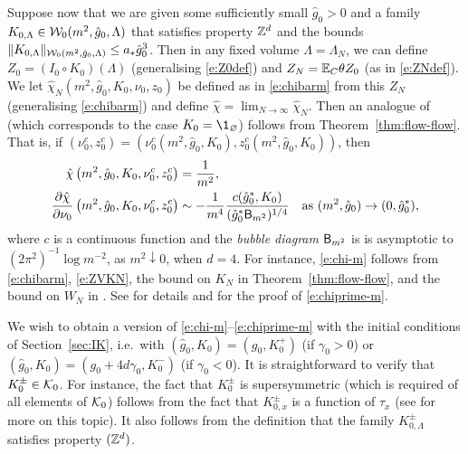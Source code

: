 
Suppose now that we are given some sufficiently small $\hat g_0 > 0$ and
a family $K_{0,\Lambda} \in \mathcal{W}_0(m^2, \hat g_0, \Lambda)$
that satisfies property ${ {{\mathbb Z}}^d }$
and the bounds $\|K_{0,\Lambda}\|_{\mathcal{W}_0(m^2, \hat g_0, \Lambda)} \le a_* \hat g_0^3$.
Then in any fixed volume $\Lambda = \Lambda_N$, we can define $Z_0 = (I_0 \circ K_0)(\Lambda)$
(generalising \eqref{e:Z0def}) and $Z_N = \mathbb{E}_C\theta Z_0$ (as in \eqref{e:ZNdef}).
We let $\hat\chi_N(m^2, \hat g_0, K_0, \nu_0, z_0)$ be defined as in \eqref{e:chibarm}
from this $Z_N$ (generalising \eqref{e:chibarm}) and define $\hat\chi = \lim_{N\to\infty} \hat\chi_N$.
Then an analogue of \cite[Theorem~\ref{log-thm:suscept-diff}]{BBS-saw4-log}
(which corresponds to the case $K_0 = \1_\varnothing$)
follows from Theorem~\ref{thm:flow-flow}.
That is, if $(\nu_0^c, z_0^c) = (\nu_0^c(m^2, \hat g_0, K_0), z_0^c(m^2, \hat g_0, K_0))$, then
\begin{align}
\label{e:chi-m}
\hat\chi \left( m^2,\hat g_0,K_0, \nu_0^c,  z_0^c \right)
  &=
\frac{1}{m^2}, \\
\label{e:chiprime-m}
\frac{\partial \hat\chi}{\partial \nu_0} \left(m^2,\hat g_0, K_0,\nu_0^c,  z_0^c \right)
  &\sim
- \frac{1}{m^4} \frac{c(\hat g_0^*, K_0)}{(\hat g_0^*{\sf B}_{m^2})^{1/4}}
  \quad \text{as $(m^2,\hat g_0) \rightarrow (0,\hat g_0^*)$},
\end{align}
where $c$ is a continuous function
and the \emph{bubble diagram} ${\sf B}_{m^2}$ is
is asymptotic to $(2\pi^2)^{-1} \log m^{-2}$, as $m^2 \downarrow 0$, when $d = 4$.
For instance, \eqref{e:chi-m} follows from \eqref{e:chibarm},
\eqref{e:ZVKN}, the bound on $K_N$ in
Theorem~\ref{thm:flow-flow},
and the bound on $W_N$ in \cite[\eqref{IE-e:W-logwish}]{BS-rg-IE}.
See \cite[Section~\ref{log-sec:suscept-diff-pf}]{BBS-saw4-log}
for details and for the proof of \eqref{e:chiprime-m}.

We wish to obtain a version of \eqref{e:chi-m}--\eqref{e:chiprime-m}
with the initial conditions of Section~\ref{sec:IK}, i.e.\ with
$(\hat g_0, K_0) = (g_0, K^+_0)$ (if $\gamma_0 > 0$) or $(\hat g_0, K_0) = (g_0 + 4d\gamma_0, K^-_0)$
(if $\gamma_0 < 0$).
It is straightforward to verify that $K^\pm_0 \in \mathcal{K}_0$.
For instance, the fact that $K^\pm_0$ is supersymmetric
(which is required of all elements of $\mathcal{K}_0$) follows
from the fact that $K^\pm_{0,x}$ is a function of $\tau_x$
(see \cite[Section~\ref{pt-sec:bulksym}]{BBS-rg-pt} for more on this topic).
It also follows from the definition that the family $K^\pm_{0,\Lambda}$
satisfies property $({ {{\mathbb Z}}^d })$.

